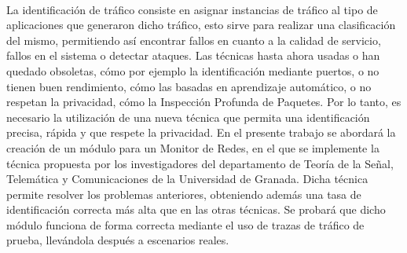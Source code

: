 \chapter*{}






\cleardoublepage
\thispagestyle{empty}

\begin{center}
{\large\bfseries \myTitle}\\
\end{center}
\begin{center}
\myName\\
\end{center}

\\

\vspace{0.7cm}
\\
La identificación de tráfico consiste en asignar instancias de tráfico al tipo de aplicaciones que generaron dicho tráfico, esto sirve para realizar una clasificación del mismo, permitiendo así encontrar fallos en cuanto a la calidad de servicio, fallos en el sistema o detectar ataques.
\intro Las técnicas hasta ahora usadas o han quedado obsoletas, cómo por ejemplo la identificación mediante puertos, o no tienen buen rendimiento, cómo las basadas en aprendizaje automático, o no respetan la privacidad, cómo la Inspección Profunda de Paquetes. Por lo tanto, es necesario la utilización de una nueva técnica que permita una identificación precisa, rápida y que respete la privacidad.
\intro En el presente trabajo se abordará la creación de un módulo para un Monitor de Redes, en el que se implemente la técnica propuesta por los investigadores del departamento de Teoría de la Señal, Telemática y Comunicaciones de la Universidad de Granada. Dicha técnica permite resolver los problemas anteriores, obteniendo además una tasa de identificación correcta más alta que en las otras técnicas.
\intro Se probará que dicho módulo funciona de forma correcta mediante el uso de trazas de tráfico de prueba, llevándola después a escenarios reales.
\cleardoublepage


